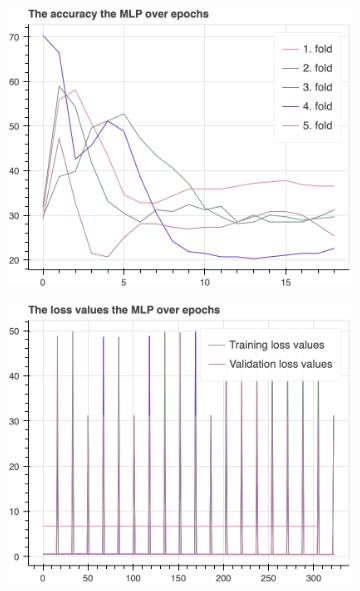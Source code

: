 		\begin{figure}[H]
			\centering
			\begin{subfigure}[b]{0.49\textwidth}
				\centering
				\includegraphics[width=\textwidth]{img/MLP_accuracy.png}
			\end{subfigure}
			\hfill
			\begin{subfigure}[b]{0.49\textwidth}
				\centering
				\includegraphics[width=\textwidth]{img/MLP_loss_values.png}
			\end{subfigure}
			\hfill
			\begin{subfigure}[b]{0.49\textwidth}

\end{subfigure}
\end{figure}
